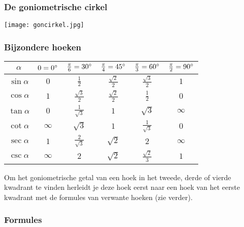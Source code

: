 \subsubsection{De goniometrische cirkel} \label{goniometrische_cirkel}
\hypertarget{goniometrische_cirkel}{}

\begin{center}
\texttt{[image: goncirkel.jpg]}
\end{center}

\subsubsection{Bijzondere hoeken} \label{bijzondere_hoeken}
\hypertarget{bijzondere_hoeken}{}

\begin{center}
  \renewcommand{\arraystretch}{1.5}
  \begin{tabular}{c|ccccc}
    $\alpha$ & $0=0^\circ$ & $\frac{\pi}{6}=30^\circ$ & $\frac{\pi}{4}=45^\circ$ & $\frac{\pi}{3}=60^\circ$ & $\frac{\pi}{2}=90^\circ$\\
    \hline
    $\sin\alpha$ & $0$ & $\frac{1}{2}$ & $\frac{\sqrt{2}}{2}$ & $\frac{\sqrt{3}}{2}$ & $1$\\
    $\cos\alpha$ & $1$ & $\frac{\sqrt{3}}{2}$ & $\frac{\sqrt{2}}{2}$ & $\frac{1}{2}$ & $0$\\
    $\tan\alpha$ & $0$ & $\frac{1}{\sqrt{3}}$ & $1$ & $\sqrt{3}$ & $\infty$\\
    $\cot\alpha$ & $\infty$ & $\sqrt{3}$ & $1$ & $\frac{1}{\sqrt{3}}$ & $0$\\
    $\sec\alpha$ & $1$ & $\frac{2}{\sqrt{3}}$ & $\sqrt{2}$ & $2$ & $\infty$\\
    $\csc\alpha$ & $\infty$ & $2$ & $\sqrt{2}$ & $\frac{\sqrt{2}}{3}$ & $1$\\
  \end{tabular}
\end{center}

Om het goniometrische getal van een hoek in het tweede, derde of vierde kwadrant te vinden herleidt je deze hoek eerst naar een hoek van het eerste kwadrant met de formules van verwante hoeken (zie verder).

\subsubsection{Formules} \label{goniometrische_formules}
\hypertarget{goniometrische_formules}{}

